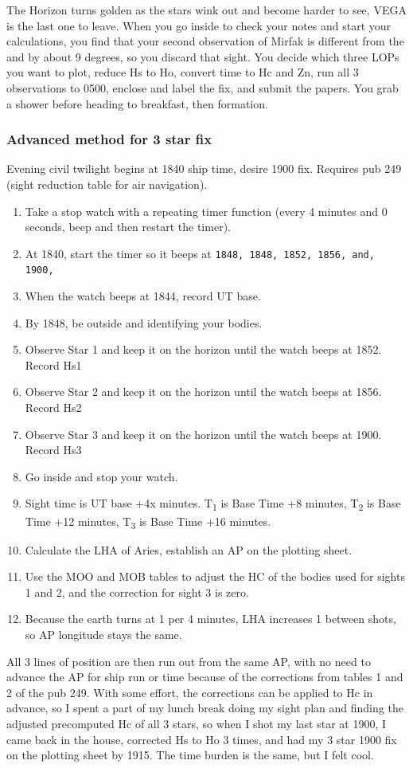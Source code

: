 \documentclass[letterpaper,12pt]{article}
\begin{document}
The Horizon turns golden as the stars wink out and become harder to see, VEGA is the last one to leave.
When you go inside to check your notes and start your calculations, you find that your second observation of Mirfak is different from the  and  by about 9 degrees, so you discard that sight.
You decide which three LOPs you want to plot, reduce Hs to Ho, convert time to Hc and Zn, run all 3 observations to 0500, enclose and label the fix, and submit the papers.
You grab a shower before heading to breakfast, then formation.

\subsubsection*{Advanced method for 3 star fix}
Evening civil twilight begins at 1840 ship time, desire 1900 fix.
Requires pub 249 (sight reduction table for air navigation). 
\begin{enumerate} \item Take a stop watch with a repeating timer function (every 4 minutes and 0 seconds, beep and then restart the timer).
\item At 1840, start the timer so it beeps at \texttt{1848, 1848, 1852, 1856, and, 1900,}
\item When the watch beeps at 1844, record UT base.
\item By 1848, be outside and identifying your bodies.
\item Observe Star 1 and keep it on the horizon until the watch beeps at 1852. Record Hs1
\item Observe Star 2 and keep it on the horizon until the watch beeps at 1856. Record Hs2
\item Observe Star 3 and keep it on the horizon until the watch beeps at 1900. Record Hs3
\item Go inside and stop your watch.
\item Sight time is UT base +4x minutes. T\textsubscript{1} is Base Time +8 minutes, T\textsubscript{2} is Base Time +12 minutes, T\textsubscript{3} is Base Time +16 minutes.
\item Calculate the LHA of Aries, establish an AP on the plotting sheet.
\item Use the MOO and MOB tables to adjust the HC of the bodies used for sights 1 and 2, and the correction for sight 3 is zero.
\item Because the earth turns at 1\textdegree{} per 4 minutes, LHA\aries{} increases 1\textdegree{} between shots, so AP longitude stays the same.
\end{enumerate}
All 3 lines of position are then run out from the same AP, with no need to advance the AP for ship run or time because of the corrections from tables 1 and 2 of the pub 249.
With some effort, the corrections can be applied to Hc in advance, so I spent a part of my lunch break doing my sight plan and finding the adjusted precomputed Hc of all 3 stars, so when I shot my last star at 1900, I came back in the house, corrected Hs to Ho 3 times, and had my 3 star 1900 fix on the plotting sheet by 1915.
The time burden is the same, but I felt cool.
\end{document}
